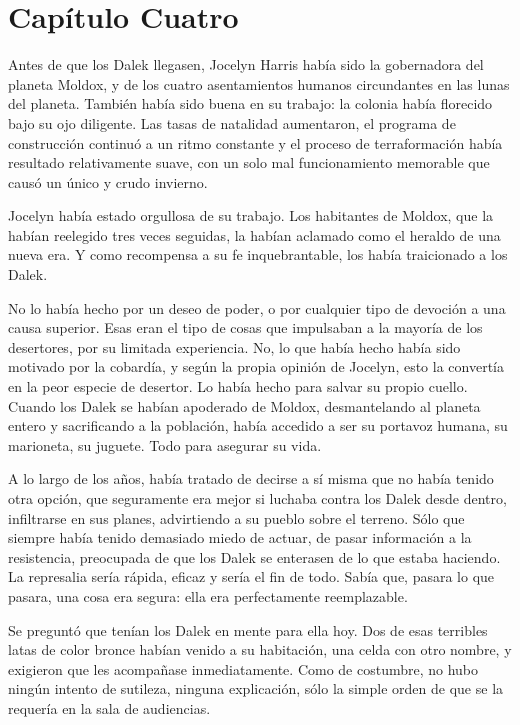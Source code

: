 \chapter*{Capítulo Cuatro}

Antes de que los Dalek llegasen, Jocelyn Harris había sido la gobernadora del planeta Moldox, y de los cuatro asentamientos humanos circundantes en las lunas del planeta. También había sido buena en su trabajo: la colonia había florecido bajo su ojo diligente. Las tasas de natalidad aumentaron, el programa de construcción continuó a un ritmo constante y el proceso de terraformación había resultado relativamente suave, con un solo mal funcionamiento memorable que causó un único y crudo invierno. 

Jocelyn había estado orgullosa de su trabajo. Los habitantes de Moldox, que la habían reelegido tres veces seguidas, la habían aclamado como el heraldo de una nueva era. Y como recompensa a su fe inquebrantable, los había traicionado a los Dalek. 

No lo había hecho por un deseo de poder, o por cualquier tipo de devoción a una causa superior. Esas eran el tipo de cosas que impulsaban a la mayoría de los desertores, por su limitada experiencia. No, lo que había hecho había sido motivado por la cobardía, y según la propia opinión de Jocelyn, esto la convertía en la peor especie de desertor. Lo había hecho para salvar su propio cuello. Cuando los Dalek se habían apoderado de Moldox, desmantelando al planeta entero y sacrificando a la población, había accedido a ser su portavoz humana, su marioneta, su juguete. Todo para asegurar su vida. 

A lo largo de los años, había tratado de decirse a sí misma que no había tenido otra opción, que seguramente era mejor si luchaba contra los Dalek desde dentro, infiltrarse en sus planes, advirtiendo a su pueblo sobre el terreno. Sólo que siempre había tenido demasiado miedo de actuar, de pasar información a la resistencia, preocupada de que los Dalek se enterasen de lo que estaba haciendo. La represalia sería rápida, eficaz y sería el fin de todo. Sabía que, pasara lo que pasara, una cosa era segura: ella era perfectamente reemplazable. 

Se preguntó que tenían los Dalek en mente para ella hoy. Dos de esas terribles latas de color bronce habían venido a su habitación, una celda con otro nombre, y exigieron que les acompañase inmediatamente. Como de costumbre, no hubo ningún intento de sutileza, ninguna explicación, sólo la simple orden de que se la requería en la sala de audiencias. 

